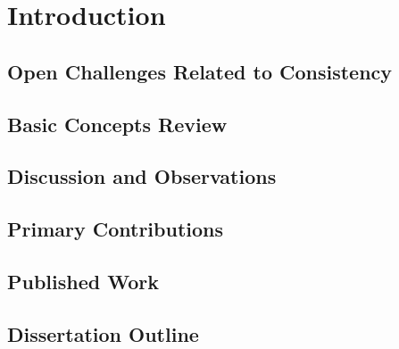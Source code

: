 \chapter{Introduction}

\section{Open Challenges Related to Consistency}

\section{Basic Concepts Review}

\section{Discussion and Observations}

\section{Primary Contributions}

\section{Published Work}

\section{Dissertation Outline}
